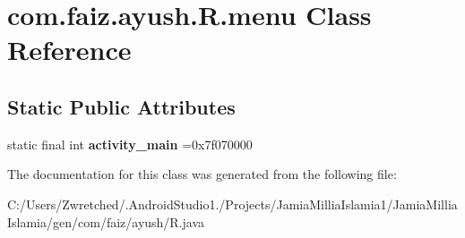 \hypertarget{classcom_1_1faiz_1_1ayush_1_1_r_1_1menu}{}\section{com.\+faiz.\+ayush.\+R.\+menu Class Reference}
\label{classcom_1_1faiz_1_1ayush_1_1_r_1_1menu}
\subsection*{Static Public Attributes}
\begin{DoxyCompactItemize}
\item 
\hypertarget{classcom_1_1faiz_1_1ayush_1_1_r_1_1menu_a32612fb22a05d2cef4f92ac4d58b836b}{}static final int {\bfseries activity\+\_\+main} =0x7f070000\label{classcom_1_1faiz_1_1ayush_1_1_r_1_1menu_a32612fb22a05d2cef4f92ac4d58b836b}

\end{DoxyCompactItemize}


The documentation for this class was generated from the following file\+:\begin{DoxyCompactItemize}
\item 
C\+:/\+Users/\+Zwretched/.\+Android\+Studio1./\+Projects/\+Jamia\+Millia\+Islamia1/\+Jamia\+Millia\+Islamia/gen/com/faiz/ayush/R.\+java\end{DoxyCompactItemize}
